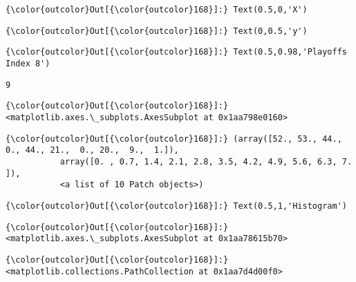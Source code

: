 \documentclass[11pt]{article}
\begin{document}
\begin{Verbatim}[commandchars=\\\{\}]
{\color{outcolor}Out[{\color{outcolor}168}]:} Text(0.5,0,'X')
\end{Verbatim}
            
\begin{Verbatim}[commandchars=\\\{\}]
{\color{outcolor}Out[{\color{outcolor}168}]:} Text(0,0.5,'y')
\end{Verbatim}
            
\begin{Verbatim}[commandchars=\\\{\}]
{\color{outcolor}Out[{\color{outcolor}168}]:} Text(0.5,0.98,'Playoffs Index 8')
\end{Verbatim}
            
    \begin{Verbatim}[commandchars=\\\{\}]
9

    \end{Verbatim}

\begin{Verbatim}[commandchars=\\\{\}]
{\color{outcolor}Out[{\color{outcolor}168}]:} <matplotlib.axes.\_subplots.AxesSubplot at 0x1aa798e0160>
\end{Verbatim}
            
\begin{Verbatim}[commandchars=\\\{\}]
{\color{outcolor}Out[{\color{outcolor}168}]:} (array([52., 53., 44.,  0., 44., 21.,  0., 20.,  9.,  1.]),
           array([0. , 0.7, 1.4, 2.1, 2.8, 3.5, 4.2, 4.9, 5.6, 6.3, 7. ]),
           <a list of 10 Patch objects>)
\end{Verbatim}
            
\begin{Verbatim}[commandchars=\\\{\}]
{\color{outcolor}Out[{\color{outcolor}168}]:} Text(0.5,1,'Histogram')
\end{Verbatim}
            
\begin{Verbatim}[commandchars=\\\{\}]
{\color{outcolor}Out[{\color{outcolor}168}]:} <matplotlib.axes.\_subplots.AxesSubplot at 0x1aa78615b70>
\end{Verbatim}
            
\begin{Verbatim}[commandchars=\\\{\}]
{\color{outcolor}Out[{\color{outcolor}168}]:} <matplotlib.collections.PathCollection at 0x1aa7d4d00f0>
\end{Verbatim}
            
\end{document}
